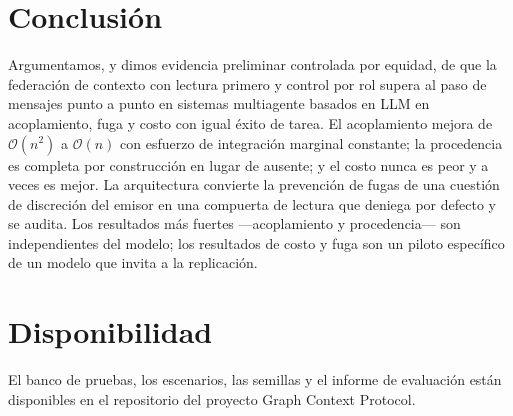 \documentclass[10pt,twocolumn,letterpaper]{article}
\newcommand{\bigoh}{\mathcal{O}}
\begin{document}
\section{Conclusión}
Argumentamos, y dimos evidencia preliminar controlada por equidad, de que la
federación de contexto con lectura primero y control por rol supera al paso de
mensajes punto a punto en sistemas multiagente basados en LLM en acoplamiento,
fuga y costo con igual éxito de tarea. El acoplamiento mejora de $\bigoh(n^2)$ a
$\bigoh(n)$ con esfuerzo de integración marginal constante; la procedencia es
completa por construcción en lugar de ausente; y el costo nunca es peor y a veces
es mejor. La arquitectura convierte la prevención de fugas de una cuestión de
discreción del emisor en una compuerta de lectura que deniega por defecto y se
audita. Los resultados más fuertes ---acoplamiento y procedencia--- son
independientes del modelo; los resultados de costo y fuga son un piloto específico
de un modelo que invita a la replicación.

\section*{Disponibilidad}
El banco de pruebas, los escenarios, las semillas y el informe de evaluación están
disponibles en el repositorio del proyecto Graph Context Protocol.



\end{document}

